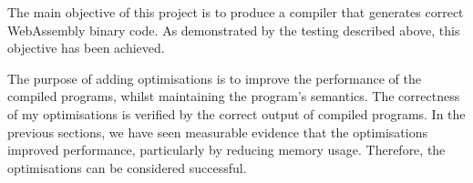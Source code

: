 \documentclass[00-main.tex]{subfiles}
\begin{document}
The main objective of this project is to produce a compiler that generates correct WebAssembly binary code.
As demonstrated by the testing described above, this objective has been achieved.

The purpose of adding optimisations is to improve the performance of the compiled programs, whilst maintaining the program's semantics.
The correctness of my optimisations is verified by the correct output of compiled programs.
In the previous sections, we have seen measurable evidence that the optimisations improved performance, particularly by reducing memory usage.
Therefore, the optimisations can be considered successful.
\end{document}
